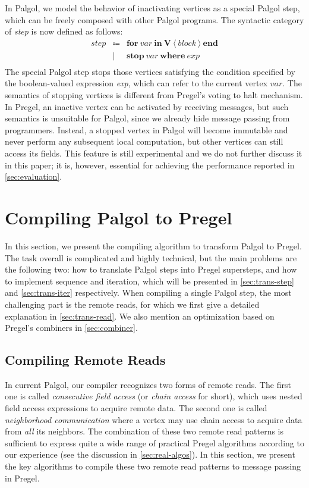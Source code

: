 \documentclass{sokendai_thesis} %
\begin{document}
In Palgol, we model the behavior of inactivating vertices as a special Palgol step, which can be freely composed with other Palgol programs.
The syntactic category of \textit{step} is now defined as follows:
\[
\begin{array}{lcl}
\mathit{step} & \Coloneqq & \mathbf{for}~\mathit{var}~\mathbf{in}~\mathbf{V}~\langle~\mathit{block}~\rangle~\mathbf{end} \\
 & | & \mathbf{stop}~\mathit{var}~\mathbf{where}~\mathit{exp} \\
\end{array}
\]
The special Palgol step stops those vertices satisfying the condition specified by the boolean-valued expression \textit{exp}, which can refer to the current vertex $\mathit{var}$.
The semantics of stopping vertices is different from Pregel's voting to halt mechanism.
In Pregel, an inactive vertex can be activated by receiving messages, but such semantics is unsuitable for Palgol, since we already hide message passing from programmers.
Instead, a stopped vertex in Palgol will become immutable and never perform any subsequent local computation, but other vertices can still access its fields.
This feature is still experimental and we do not further discuss it in this paper; it is, however, essential for achieving the performance reported in \autoref{sec:evaluation}.

\chapter{Compiling Palgol to Pregel}
\label{sec:compilation}

In this section, we present the compiling algorithm to transform Palgol to Pregel.
The task overall is complicated and highly technical, but the main problems are the following two: how to translate Palgol steps into Pregel supersteps, and how to implement sequence and iteration, which will be presented in \autoref{sec:trans-step} and \autoref{sec:trans-iter} respectively.
When compiling a single Palgol step, the most challenging part is the remote reads, for which we first give a detailed explanation in \autoref{sec:trans-read}.
We also mention an optimization based on Pregel's combiners in \autoref{sec:combiner}.

\section{Compiling Remote Reads}
\label{sec:trans-read}

In current Palgol, our compiler recognizes two forms of remote reads.
The first one is called \emph{consecutive field access} (or \emph{chain access} for short), which uses nested field access expressions to acquire remote data.
The second one is called \emph{neighborhood communication} where a vertex may use chain access to acquire data from \emph{all} its neighbors.
The combination of these two remote read patterns is sufficient to express quite a wide range of practical Pregel algorithms according to our experience (see the discussion in \autoref{sec:real-algos}).
In this section, we present the key algorithms to compile these two remote read patterns to message passing in Pregel.
\end{document}
